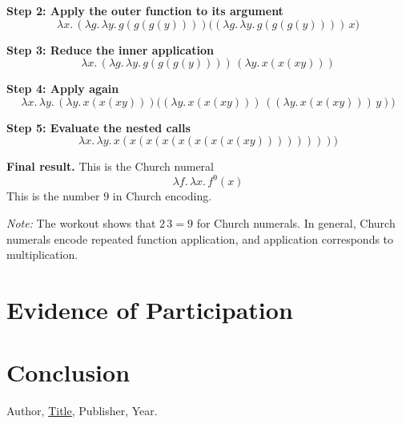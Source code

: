 \documentclass{article}
\theoremstyle{theorem}
\theoremstyle{definition}
\theoremstyle{remark}
\begin{document}
\noindent
\textbf{Step 2: Apply the outer function to its argument}
\[
\lambda x.\, (\lambda g.\,\lambda y.\, g(g(g(y)))) \big( (\lambda g.\,\lambda y.\, g(g(g(y))))\, x \big)
\]

\noindent
\textbf{Step 3: Reduce the inner application}
\[
\lambda x.\, (\lambda g.\,\lambda y.\, g(g(g(y)))) \, (\lambda y.\, x(x(xy)))
\]

\noindent
\textbf{Step 4: Apply again}
\[
\lambda x.\,\lambda y.\, (\lambda y.\, x(x(xy))) \big((\lambda y.\, x(x(xy))) \, ((\lambda y.\, x(x(xy)))\, y)\big)
\]

\noindent
\textbf{Step 5: Evaluate the nested calls}
\[
\lambda x.\,\lambda y.\, x(x(x(x(x(x(x(x(xy)))))))))
\]

\noindent
\textbf{Final result.} This is the Church numeral
\[
\lambda f.\,\lambda x.\, f^9(x)
\]
This is the number $9$ in Church encoding.

\medskip
\noindent
\emph{Note:} The workout shows that $2\,3 = 9$ for Church numerals. In general, Church numerals encode repeated function application, and application corresponds to multiplication.


\section{Evidence of Participation}

\section{Conclusion}\label{conclusion}

\begin{thebibliography}{99}
 Author, \href{https://en.wikipedia.org/wiki/LaTeX}{Title}, Publisher, Year.
\end{thebibliography}
\end{document}
